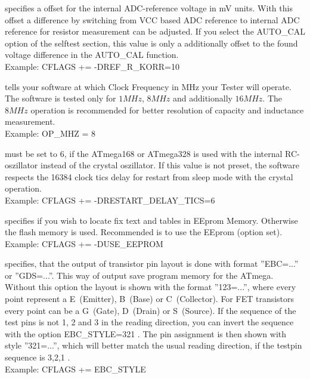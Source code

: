 \begin{description} \setlength{\itemsep}{0em}

  \item[REF\_R\_KORR] specifies a offset for the internal ADC-reference voltage in mV units.
With this offset a difference by switching from VCC based ADC reference to internal ADC reference for resistor measurement can be adjusted.
If you select the AUTO\_CAL option of the selftest section, this value is only a additionally offset to the found voltage 
difference in the AUTO\_CAL function.\\
Example: CFLAGS += -DREF\_R\_KORR=10

  \item[OP\_MHZ] tells your software at which Clock Frequency in MHz your Tester will operate.
The software is tested only for \(1MHz\), \(8MHz\) and additionally \(16MHz\). 
The \(8MHz\) operation is recommended for better resolution of capacity and inductance measurement.\\
Example: OP\_MHZ = 8

  \item[RESTART\_DELAY\_TICS] must be set to 6, if the ATmega168 or ATmega328 is used with the internal RC-oszillator instead of
the crystal oszillator.
If this value is not preset, the software respects the 16384 clock tics delay for restart from sleep mode with the crystal operation.\\
Example: CFLAGS += -DRESTART\_DELAY\_TICS=6

  \item[USE\_EEPROM] specifies if you wish to locate fix text and tables in EEprom Memory. Otherwise the flash memory is used.
Recommended is to use the EEprom (option set).\\
Example: CFLAGS += -DUSE\_EEPROM

\item[EBC\_STYLE] specifies, that the output of transistor pin layout is done with format ''EBC=...'' or ''GDS=...''.
This way of output save program memory for the ATmega. Without this option the layout is shown with the
format ''123=...'', where every point represent a E~(Emitter), B~(Base) or C~(Collector).
For FET transistors every point can be a G~(Gate), D~(Drain) or S~(Source).
If the sequence of the test pins is not 1, 2 and 3 in the reading direction, you can invert the sequence with the option
EBC\_STYLE=321 . The pin assignment is then shown with style ''321=...'', which will better match the usual
reading direction, if the testpin sequence is 3,2,1 .\\
Example: CFLAGS += EBC\_STYLE


\end{description}
